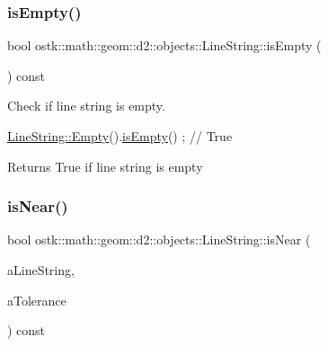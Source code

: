 \mbox{\label{classostk_1_1math_1_1geom_1_1d2_1_1objects_1_1_line_string_a2fe1d6a0a8a917b00b13ab9c3cf24bf3}} 
\subsubsection{\texorpdfstring{is\+Empty()}{isEmpty()}}
{\footnotesize\ttfamily bool ostk\+::math\+::geom\+::d2\+::objects\+::\+Line\+String\+::is\+Empty (\begin{DoxyParamCaption}{ }\end{DoxyParamCaption}) const}



Check if line string is empty. 


\begin{DoxyCode}
\hyperlink{classostk_1_1math_1_1geom_1_1d2_1_1objects_1_1_line_string_a3557befd15577368d8cc2f9c2a74dfec}{LineString::Empty}().\hyperlink{classostk_1_1math_1_1geom_1_1d2_1_1objects_1_1_line_string_a2fe1d6a0a8a917b00b13ab9c3cf24bf3}{isEmpty}() ; \textcolor{comment}{// True}
\end{DoxyCode}


\begin{DoxyReturn}{Returns}
True if line string is empty 
\end{DoxyReturn}
\mbox{\label{classostk_1_1math_1_1geom_1_1d2_1_1objects_1_1_line_string_a5772e2ac0f24c76d9957e1617077b04a}} 
\subsubsection{\texorpdfstring{is\+Near()}{isNear()}}
{\footnotesize\ttfamily bool ostk\+::math\+::geom\+::d2\+::objects\+::\+Line\+String\+::is\+Near (\begin{DoxyParamCaption}\item[{const \hyperlink{classostk_1_1math_1_1geom_1_1d2_1_1objects_1_1_line_string}{Line\+String} \&}]{a\+Line\+String,  }\item[{const Real \&}]{a\+Tolerance }\end{DoxyParamCaption}) const}




